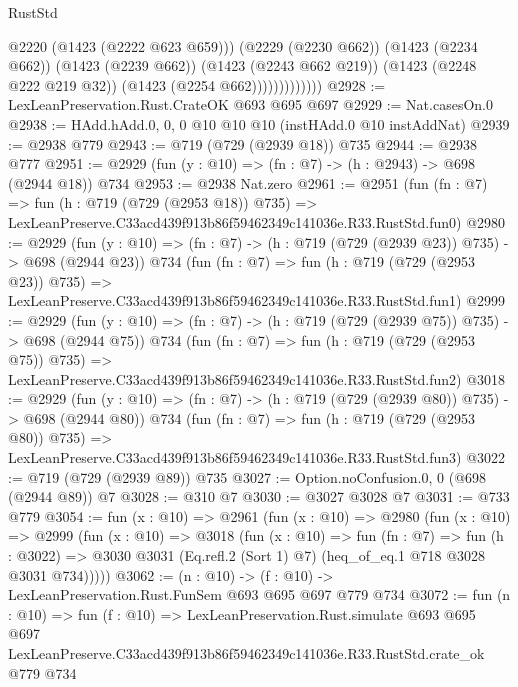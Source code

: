 \begin{lexlean}{RustStd}
\begin{coremodule}
                            @2220
                            (@1423 (@2222 @623 @659)))
                          (@2229 (@2230 @662))
                          (@1423 (@2234 @662))
                          (@1423 (@2239 @662))
                          (@1423 (@2243 @662 @219))
                          (@1423 (@2248 @222 @219 @32))
                          (@1423 (@2254 @662)))))))))))))
@2928 := LexLeanPreservation.Rust.CrateOK @693 @695 @697
@2929 := Nat.casesOn.{0}
@2938 := HAdd.hAdd.{0, 0, 0} @10 @10 @10 (instHAdd.{0} @10 instAddNat)
@2939 := @2938 @779
@2943 := @719 (@729 (@2939 @18)) @735
@2944 := @2938 @777
@2951 := @2929 (fun (y : @10) => (fn : @7) -> (h : @2943) -> @698 (@2944 @18)) @734
@2953 := @2938 Nat.zero
@2961 := @2951
    (fun (fn : @7) =>
    fun (h : @719 (@729 (@2953 @18)) @735) =>
    LexLeanPreserve.C33acd439f913b86f59462349c141036e.R33.RustStd.fun0)
@2980 := @2929
    (fun (y : @10) => (fn : @7) -> (h : @719 (@729 (@2939 @23)) @735) -> @698 (@2944 @23))
    @734
    (fun (fn : @7) =>
    fun (h : @719 (@729 (@2953 @23)) @735) =>
    LexLeanPreserve.C33acd439f913b86f59462349c141036e.R33.RustStd.fun1)
@2999 := @2929
    (fun (y : @10) => (fn : @7) -> (h : @719 (@729 (@2939 @75)) @735) -> @698 (@2944 @75))
    @734
    (fun (fn : @7) =>
    fun (h : @719 (@729 (@2953 @75)) @735) =>
    LexLeanPreserve.C33acd439f913b86f59462349c141036e.R33.RustStd.fun2)
@3018 := @2929
    (fun (y : @10) => (fn : @7) -> (h : @719 (@729 (@2939 @80)) @735) -> @698 (@2944 @80))
    @734
    (fun (fn : @7) =>
    fun (h : @719 (@729 (@2953 @80)) @735) =>
    LexLeanPreserve.C33acd439f913b86f59462349c141036e.R33.RustStd.fun3)
@3022 := @719 (@729 (@2939 @89)) @735
@3027 := Option.noConfusion.{0, 0} (@698 (@2944 @89)) @7
@3028 := @310 @7
@3030 := @3027 @3028 @7
@3031 := @733 @779
@3054 := fun (x : @10) =>
  @2961
    (fun (x : @10) =>
    @2980
      (fun (x : @10) =>
      @2999
        (fun (x : @10) =>
        @3018
          (fun (x : @10) =>
          fun (fn : @7) =>
          fun (h : @3022) =>
          @3030 @3031 (Eq.refl.{2} (Sort 1) @7) (heq_of_eq.{1} @718 @3028 @3031 @734)))))
@3062 := (n : @10) -> (f : @10) -> LexLeanPreservation.Rust.FunSem @693 @695 @697 @779 @734
@3072 := fun (n : @10) =>
  fun (f : @10) =>
  LexLeanPreservation.Rust.simulate
    @693
    @695
    @697
    LexLeanPreserve.C33acd439f913b86f59462349c141036e.R33.RustStd.crate_ok
    @779
    @734
\end{coremodule}
\end{lexlean}

